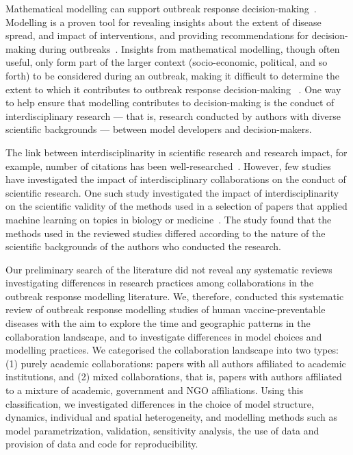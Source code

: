 \documentclass[10pt,letterpaper]{article}
\begin{document}
Mathematical modelling can support outbreak response decision-making~\cite{Lofgren2015}. Modelling is a proven tool for revealing insights about the extent of disease spread, and impact of interventions, and providing recommendations for decision-making during outbreaks~\cite{Kretzschmar2020,Whitty2014,Lofgren2015}. Insights from mathematical modelling, though often useful, only form part of the larger context (socio-economic, political, and so forth) to be considered during an outbreak, making it difficult to determine the extent to which it contributes to outbreak response decision-making ~\cite{Kretzschmar2020,Kerkhove2012}. One way to help ensure that modelling contributes to decision-making is the conduct of interdisciplinary research  --- that is, research conducted by authors with diverse scientific backgrounds --- between model developers and decision-makers.

The link between interdisciplinarity in scientific research and research impact, for example, number of citations has been well-researched~\cite{Abramo2017,Wagner2011}. However, few studies have investigated the impact of interdisciplinary collaborations on the conduct of scientific research. One such study investigated the impact of interdisciplinarity on the scientific validity of the methods used in a selection of papers that applied machine learning on topics in biology or medicine~\cite{Littmann2020}. The study found that the methods used in the reviewed studies differed according to the nature of the scientific backgrounds of the authors who conducted the research. 


Our preliminary search of the literature did not reveal any systematic reviews investigating differences in research practices among collaborations in the outbreak response modelling literature. We, therefore, conducted this systematic review of outbreak response modelling studies of human vaccine-preventable diseases with the aim to explore the time and geographic patterns in the collaboration landscape, and to investigate differences in model choices and modelling practices. We categorised the collaboration landscape into two types: (1) purely academic collaborations: papers with all authors affiliated to academic institutions, and (2) mixed collaborations, that is, papers with authors affiliated to a mixture of academic, government and NGO affiliations. Using this classification, we investigated differences in the choice of model structure, dynamics, individual and spatial heterogeneity, and modelling methods such as model parametrization, validation, sensitivity analysis, the use of data and provision of data and code for reproducibility. 
\end{document}
